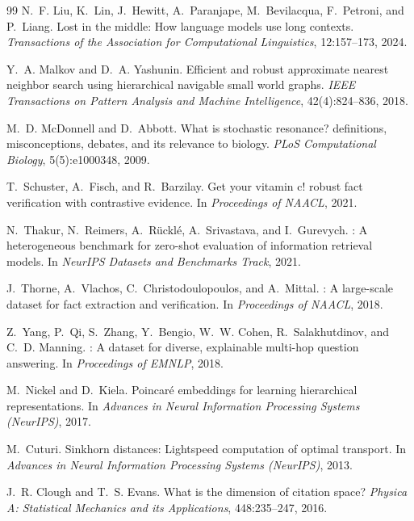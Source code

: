 \documentclass[11pt,a4paper]{article}
\begin{document}
\begin{thebibliography}{99}
N.~F. Liu, K.~Lin, J.~Hewitt, A.~Paranjape, M.~Bevilacqua, F.~Petroni, and P.~Liang.
\newblock Lost in the middle: How language models use long contexts.
\newblock \emph{Transactions of the Association for Computational Linguistics}, 12:157--173, 2024.

Y.~A. Malkov and D.~A. Yashunin.
\newblock Efficient and robust approximate nearest neighbor search using hierarchical navigable small world graphs.
\newblock \emph{IEEE Transactions on Pattern Analysis and Machine Intelligence}, 42(4):824--836, 2018.

M.~D. McDonnell and D.~Abbott.
\newblock What is stochastic resonance? definitions, misconceptions, debates, and its relevance to biology.
\newblock \emph{PLoS Computational Biology}, 5(5):e1000348, 2009.

T.~Schuster, A.~Fisch, and R.~Barzilay.
\newblock Get your vitamin c! robust fact verification with contrastive evidence.
\newblock In \emph{Proceedings of NAACL}, 2021.

N.~Thakur, N.~Reimers, A.~R{\"u}ckl{\'e}, A.~Srivastava, and I.~Gurevych.
: A heterogeneous benchmark for zero-shot evaluation of information retrieval models.
\newblock In \emph{NeurIPS Datasets and Benchmarks Track}, 2021.

J.~Thorne, A.~Vlachos, C.~Christodoulopoulos, and A.~Mittal.
: A large-scale dataset for fact extraction and verification.
\newblock In \emph{Proceedings of NAACL}, 2018.

Z.~Yang, P.~Qi, S.~Zhang, Y.~Bengio, W.~W. Cohen, R.~Salakhutdinov, and C.~D. Manning.
: A dataset for diverse, explainable multi-hop question answering.
\newblock In \emph{Proceedings of EMNLP}, 2018.

M.~Nickel and D.~Kiela.
\newblock Poincar{\'e} embeddings for learning hierarchical representations.
\newblock In \emph{Advances in Neural Information Processing Systems (NeurIPS)}, 2017.

M.~Cuturi.
\newblock Sinkhorn distances: Lightspeed computation of optimal transport.
\newblock In \emph{Advances in Neural Information Processing Systems (NeurIPS)}, 2013.

J.~R. Clough and T.~S. Evans.
\newblock What is the dimension of citation space?
\newblock \emph{Physica A: Statistical Mechanics and its Applications}, 448:235--247, 2016.


\end{thebibliography}
\end{document}
